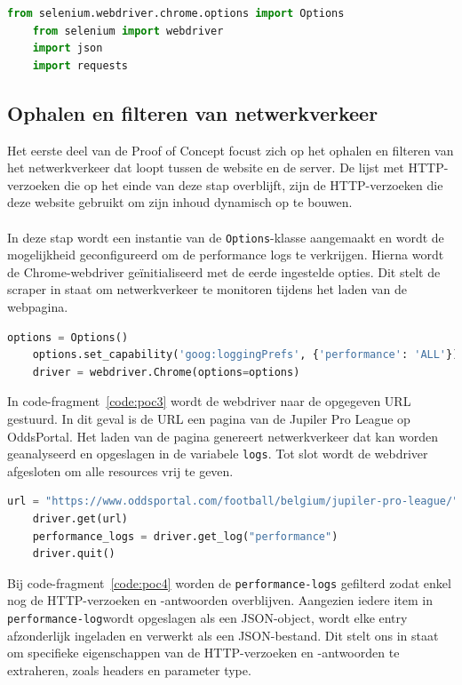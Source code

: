 \begin{lstlisting}[language=python, captionpos=b, caption={De imports voor Proof of Concept.}, label={code:poc1}]
    from selenium.webdriver.chrome.options import Options
    from selenium import webdriver
    import json
    import requests
\end{lstlisting}

\subsection{Ophalen en filteren van netwerkverkeer}
Het eerste deel van de Proof of Concept focust zich op het ophalen en filteren van het netwerkverkeer dat loopt tussen de website en de server. De lijst met HTTP-verzoeken die op het einde van deze stap overblijft, zijn de HTTP-verzoeken die deze website gebruikt om zijn inhoud dynamisch op te bouwen.
\\ \\
In deze stap wordt een instantie van de \texttt{Options}-klasse aangemaakt en wordt de mogelijkheid geconfigureerd om de performance logs te verkrijgen. Hierna wordt de Chrome-webdriver geïnitialiseerd  met de eerde ingestelde opties. Dit stelt de scraper in staat om netwerkverkeer te monitoren tijdens het laden van de webpagina.
\begin{lstlisting}[language=python, captionpos=b, caption={De imports voor Proof of Concept.}, label={code:poc2}]
    options = Options()
    options.set_capability('goog:loggingPrefs', {'performance': 'ALL'})
    driver = webdriver.Chrome(options=options)
\end{lstlisting}

In code-fragment~\ref{code:poc3} wordt de webdriver naar de opgegeven URL gestuurd. In dit geval is de URL een pagina van de Jupiler Pro League op OddsPortal. Het laden van de pagina genereert netwerkverkeer dat kan worden geanalyseerd en opgeslagen in de variabele \texttt{logs}. Tot slot wordt de webdriver afgesloten om alle resources vrij te geven.

\begin{lstlisting}[language=python, captionpos=b, caption={Ophalen van het netwerkverkeer}, label={code:poc3}]
    url = "https://www.oddsportal.com/football/belgium/jupiler-pro-league/"
    driver.get(url)
    performance_logs = driver.get_log("performance")
    driver.quit()
\end{lstlisting}

Bij code-fragment~\ref{code:poc4} worden de \texttt{performance-logs} gefilterd zodat enkel nog de HTTP-verzoeken en -antwoorden overblijven. Aangezien iedere item in \texttt{performance-log}wordt opgeslagen als een JSON-object, wordt elke entry afzonderlijk ingeladen en verwerkt als een JSON-bestand. Dit stelt ons in staat om specifieke eigenschappen van de HTTP-verzoeken en -antwoorden te extraheren, zoals headers en parameter type.

